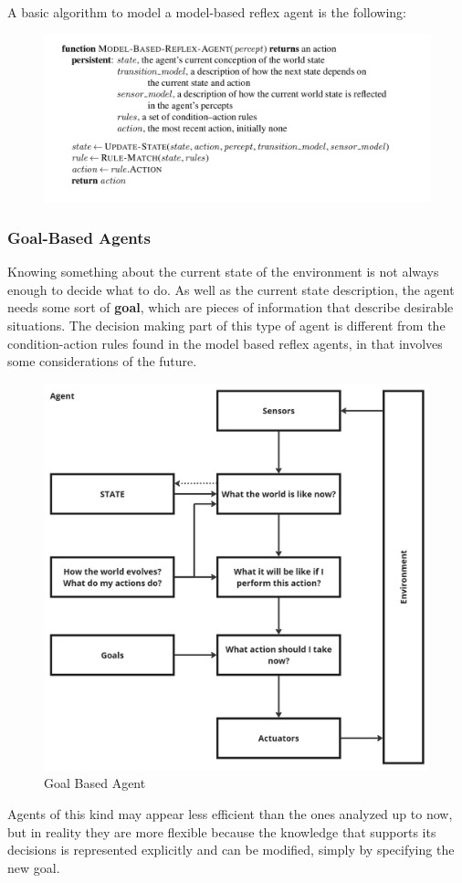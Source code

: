 \documentclass{article}
\begin{document}
A basic algorithm to model a model-based reflex agent is the following:
\begin{figure}[h]
    \centering
    \includegraphics[width=\linewidth]{algorithms/Model Based Reflex Agent.png}
    \label{fig:model_based_reflex_agent_algorithm}
\end{figure}

\subsubsection{Goal-Based Agents}
Knowing something about the current state of the environment is not always enough to decide what to do. As well as the current state description, the agent needs some sort of \textbf{goal}, which are pieces of information that describe desirable situations. The decision making part of this type of agent is different from the condition-action rules found in the model based reflex agents, in that involves some considerations of the future.

\begin{figure}[h]
    \centering
    \includegraphics[width=0.5\linewidth]{images/Goal Based Agent.jpg}
    \caption{Goal Based Agent}
    \label{fig:goal_based_agent}
\end{figure}

Agents of this kind may appear less efficient than the ones analyzed up to now, but in reality they are more flexible because the knowledge that supports its decisions is represented explicitly and can be modified, simply by specifying the new goal.
\end{document}
